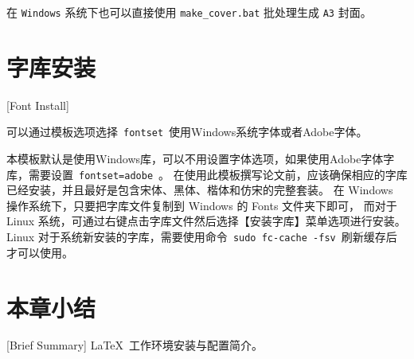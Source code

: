 在 \texttt{Windows} 系统下也可以直接使用 \texttt{make\_cover.bat} 批处理生成 \texttt{A3} 封面。

\section{字库安装}[Font Install]

可以通过模板选项选择~\texttt{fontset}~使用Windows系统字体或者Adobe字体。

本模板默认是使用Windows库，可以不用设置字体选项，如果使用Adobe字体字库，需要设置~\texttt{fontset=adobe}~。
在使用此模板撰写论文前，应该确保相应的字库已经安装，并且最好是包含宋体、黑体、楷体和仿宋的完整套装。
在 Windows 操作系统下，只要把字库文件复制到 Windows 的 Fonts 文件夹下即可，
而对于 Linux 系统，可通过右键点击字库文件然后选择【安装字库】菜单选项进行安装。
Linux 对于系统新安装的字库，需要使用命令~\texttt{sudo fc-cache -fsv}~刷新缓存后才可以使用。

\section*{本章小结}[Brief Summary]
\LaTeX{}~工作环境安装与配置简介。
